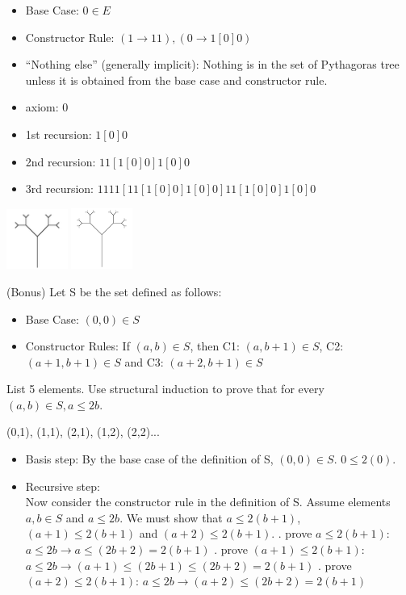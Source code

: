\documentclass[solution, letterpaper]{cs20inclass}
\begin{document}
\begin{solution}
\subsolution
\begin{itemize}
\item Base Case:  $0\in E$
\item Constructor Rule:  $(1\rightarrow 11), (0\rightarrow 1[0]0)$
\item “Nothing else” (generally implicit): Nothing is in the set of Pythagoras tree unless it is obtained from the base case and constructor rule.
\end{itemize}
\subsolution 
\begin{itemize}
\item axiom:	0
\item 1st recursion:	$1[0]0$
\item 2nd recursion: $11[1[0]0]1[0]0$
\item 3rd recursion:	$1111[11[1[0]0]1[0]0]11[1[0]0]1[0]0$
\end{itemize}
\subsolution
\includegraphics[width=2cm]{3} 
\includegraphics[width=2cm]{4}
\end{solution}


\problem (Bonus) Let S be the set defined as follows:
\begin{itemize}
\item Base Case: $(0,0) \in S$
\item Constructor Rules: If $(a,b)\in S$, then C1: $(a, b+1) \in S$, C2: $(a+1,b+1)\in S$ and C3: $(a+2, b+1)\in S$ 
\end{itemize}
\subproblem List 5 elements.
\subproblem Use structural induction to prove that for every $(a,b)\in S, a\leq 2b$.

\begin{solution}
\subsolution (0,1), (1,1), (2,1), (1,2), (2,2)...
\subsolution
\begin{itemize}
\item Basis step: By the base case of the definition of S, $(0,0)\in S$. $0\leq2(0)$.
\item Recursive step: \\
Now consider the constructor rule in the definition of S. Assume elements $a,b\in S$ and $ a\leq 2b$. We must  show that $a\leq2(b+1)$, $(a+1)\leq2(b+1)$ and $(a+2)\leq2(b+1)$.
. prove $a\leq2(b+1)$:  $a\leq2b\rightarrow a\leq(2b+2)=2(b+1)$
. prove $(a+1)\leq2(b+1)$: $a\leq2b \rightarrow (a+1)\leq(2b+1)\leq(2b+2)=2(b+1)$
. prove $(a+2)\leq2(b+1)$:  $a\leq2b \rightarrow (a+2)\leq(2b+2)=2(b+1)$
\end{itemize}
\end{solution}
\end{document}
